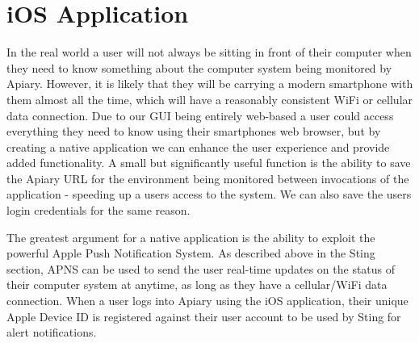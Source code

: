 \section{iOS Application}

In the real world a user will not always be sitting in front of their computer
when they need to know something about the computer system being monitored by
Apiary. However, it is likely that they will be carrying a modern smartphone
with them almost all the time, which will have a reasonably consistent WiFi or
cellular data connection. Due to our GUI being entirely web-based a user could
access everything they need to know using their smartphones web browser, but by
creating a native application we can enhance the user experience and provide
added functionality. A small but significantly useful function is the ability
to save the Apiary URL for the environment being monitored between invocations
of the application - speeding up a users access to the system. We can also save
the users login credentials for the same reason.

The greatest argument for a native application is the ability to exploit the
powerful Apple Push Notification System. As described above in the Sting
section, APNS can be used to send the user real-time updates on the status of
their computer system at anytime, as long as they have a cellular/WiFi data
connection. When a user logs into Apiary using the iOS application, their
unique Apple Device ID is registered against their user account to be used by
Sting for alert notifications.
